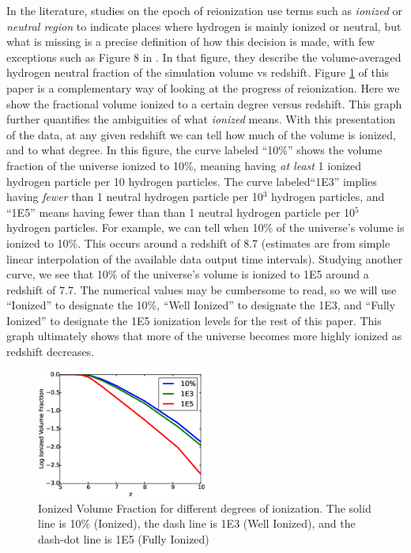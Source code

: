 \documentclass[letterpaper,10pt]{article}
\renewcommand{\(}{\left(}
\renewcommand{\)}{\right)}
\begin{document}
In the literature, studies on the epoch of reionization use
terms such as {\em ionized} or {\em neutral region} to indicate places
where hydrogen is mainly ionized or neutral, but what is missing is a
precise definition of how this decision is made, with few exceptions
such as Figure 8 in \citealt{PetkovaSpringel2011a}.  In that figure,
they describe the volume-averaged hydrogen neutral fraction of the
simulation volume vs redshift.  Figure \ref{Log_Ionized_vs_Redshift}
of this paper is a complementary way of looking at the progress of
reionization.  Here we show the fractional volume ionized to a certain
degree versus redshift.  This graph further quantifies the ambiguities
of what {\em ionized} means.  With this presentation of the data, at
any given redshift we can tell how much of the volume is ionized, and
to what degree.  In this figure, the curve labeled ``10\%'' shows the
volume fraction of the universe ionized to 10\%, meaning having {\em
  at least} 1 ionized hydrogen particle per 10 hydrogen particles. 
The curve labeled``1E3'' implies having {\em fewer} than
1 neutral hydrogen particle per 10$^3$ hydrogen particles, and ``1E5''
means having fewer than than 1 neutral hydrogen particle per 10$^5$
hydrogen particles.  For example, we can tell when 10\% of the
universe's volume is ionized to 10\%.  This occurs around a redshift of 
8.7 (estimates are from simple linear interpolation of the available
data output time
intervals).  Studying another curve, we see that 10\% of the
universe's volume is ionized to 1E5 around a redshift of 7.7.  The
numerical values may be cumbersome to read, so we will use ``Ionized''
to designate the 10\%, ``Well Ionized'' to designate the 1E3, and
``Fully Ionized'' to designate the 1E5 ionization levels for the rest
of this paper.  This graph ultimately shows that more of the universe
becomes more highly ionized as redshift decreases. 

\begin{figure}
  \includegraphics[width=0.5\textwidth]{Log_Ionized_vs_Redshift.eps}
  \caption{\footnotesize Ionized Volume Fraction for different degrees of ionization.  
    The solid line is 10\% (Ionized), the dash line is 1E3 (Well Ionized), and the dash-dot line is 1E5 (Fully Ionized)}
  \label{Log_Ionized_vs_Redshift}
\end{figure}
\end{document}
